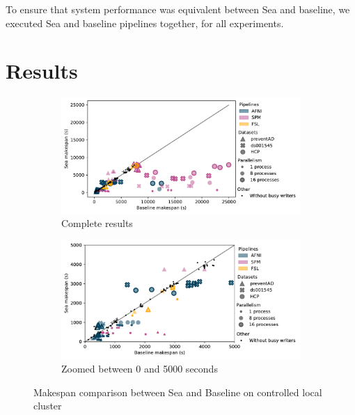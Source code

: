     To ensure that system performance was equivalent between Sea and baseline, we executed Sea and baseline pipelines together, for all experiments.
    
    \section{Results}


\begin{figure}

\begin{subfigure}{\textwidth}
    \centering
    \captionsetup{width=.85\linewidth}
    \includegraphics[width=\columnwidth]{figures/sea-neuro/slashbin_results.pdf}%
    \caption{Complete results}\label{fig:seaneuro:slashbinfull}
\end{subfigure}
\begin{subfigure}{\textwidth}
    \centering
    \captionsetup{width=.85\linewidth}
    \includegraphics[width=\linewidth]{figures/sea-neuro/slashbin_results_zoomed.pdf}
    \caption{Zoomed between 0 and 5000 seconds}\label{fig:seaneuro:slashbinzoom}
\end{subfigure}
\caption{Makespan comparison between Sea and Baseline on controlled local cluster}
\label{fig:seaneuro:slashbin}
\end{figure}

